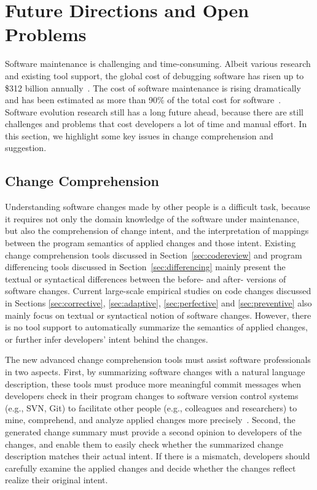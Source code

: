 \section{Future Directions and Open Problems} 

Software maintenance is challenging and time-consuming. Albeit various research and existing tool support, the global cost of debugging software has risen up to \$312 billion annually~\cite{globalcost}. The cost of software maintenance is rising dramatically and has been estimated as more than 90\% of the total cost for software~\cite{Omnext2010}. Software evolution research still has a long future ahead, because there are still challenges and problems that cost developers a lot of time and manual effort. In this section, we highlight some key issues in change comprehension and suggestion.

\subsection{Change Comprehension}
Understanding software changes made by other people is a difficult task, because it requires not only the domain knowledge of the software under maintenance, but also the comprehension of change intent, and the interpretation of mappings between the program semantics of applied changes and those intent. Existing change comprehension tools discussed in Section~\ref{sec:codereview} and program differencing tools discussed in Section~\ref{sec:differencing} mainly present the textual or syntactical differences between the before- and after- versions of software changes. Current large-scale empirical studies on code changes discussed in Sections \ref{sec:corrective}, \ref{sec:adaptive}, \ref{sec:perfective} and \ref{sec:preventive} also mainly focus on textual or syntactical notion of software changes. However, there is no tool support to automatically summarize the semantics of applied changes, or further infer developers' intent behind the changes. 

The new advanced change comprehension tools must assist software professionals in two aspects. First, by summarizing software changes with a natural language description, these tools must produce more meaningful commit messages when developers check in their program changes to software version control systems (e.g., SVN, Git) to facilitate other people (e.g., colleagues and researchers) to mine, comprehend, and analyze applied changes more precisely~\cite{herzig2013impact}. Second, the generated change summary must provide a second opinion to developers of the changes, and enable them to easily check whether the summarized change description matches their actual intent. If there is a mismatch, developers should carefully examine the applied changes and decide whether the changes reflect realize their original intent. 

